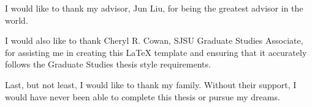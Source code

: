 I would like to thank my advisor, Jun Liu, for being the greatest advisor in the world.

I would also like to thank Cheryl R. Cowan, SJSU Graduate Studies Associate, for assisting me in creating this LaTeX template and ensuring that it accurately follows the Graduate Studies thesis style requirements.

Last, but not least, I would like to thank my family. Without their support, I would have never been able to complete this thesis or pursue my dreams.